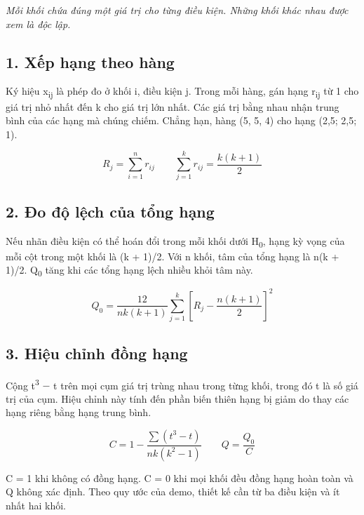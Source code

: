 \documentclass[11pt,a4paper]{article}
\newcommand{\ReportLead}[1]{{\large\itshape #1\par}\medskip}
\begin{document}
\ReportLead{Mỗi khối chứa đúng một giá trị cho từng điều kiện. Những khối khác nhau được xem là độc lập.}

\subsection*{1. Xếp hạng theo hàng}

Ký hiệu x\textsubscript{ij} là phép đo ở khối i, điều kiện j. Trong mỗi hàng, gán hạng
r\textsubscript{ij} từ 1 cho giá trị nhỏ nhất đến k cho giá trị lớn nhất. Các giá trị bằng nhau nhận
trung bình của các hạng mà chúng chiếm. Chẳng hạn, hàng (5, 5, 4) cho hạng (2,5; 2,5;
1).~\cite{ref-2,ref-3}

\begin{equation}
  R_{j} = \sum_{i = 1}^{n} r_{ij}\qquad \sum_{j = 1}^{k} r_{ij} = \frac{k(k + 1)}{2}\label{eq:1}
\end{equation}

\subsection*{2. Đo độ lệch của tổng hạng}

Nếu nhãn điều kiện có thể hoán đổi trong mỗi khối dưới H\textsubscript{0}, hạng kỳ vọng của mỗi cột trong
một khối là (k + 1)/2. Với n khối, tâm của tổng hạng là n(k + 1)/2. Q\textsubscript{0} tăng khi các tổng
hạng lệch nhiều khỏi tâm này.~\cite{ref-2}

\begin{equation}
  Q_{0} = \frac{12}{nk(k + 1)} \sum_{j = 1}^{k} [ R_{j} - \frac{n(k + 1)}{2} ]^{2}\label{eq:2}
\end{equation}

\subsection*{3. Hiệu chỉnh đồng hạng}

Cộng t\textsuperscript{3} \ensuremath{-} t trên mọi cụm giá trị trùng nhau trong từng khối, trong đó t là
số giá trị của cụm. Hiệu chỉnh này tính đến phần biến thiên hạng bị giảm do thay các hạng riêng bằng hạng
trung bình.~\cite{ref-2,ref-3}

\begin{equation}
  C = 1 - \frac{\sum (t^{3} - t)}{nk(k^{2} - 1)}\qquad Q = \frac{Q_{0}}{C}\label{eq:3}
\end{equation}

C = 1 khi không có đồng hạng. C = 0 khi mọi khối đều đồng hạng hoàn toàn và Q không xác định. Theo quy
ước của demo, thiết kế cần từ ba điều kiện và ít nhất hai khối.
\end{document}
